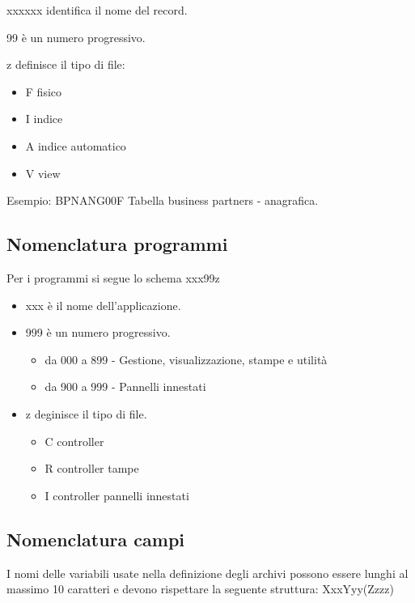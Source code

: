 \documentclass[target=bach,aauheader=,style=]{thud}
\begin{document}
xxxxxx identifica il nome del record.

99 è un numero progressivo.

z definisce il tipo di file:
\begin{itemize}
    \item F fisico
    \item I indice
    \item A indice automatico
    \item V view
\end{itemize}

Esempio: BPNANG00F Tabella business partners - anagrafica.

\subsection{Nomenclatura programmi}
Per i programmi si segue lo schema xxx99z

\begin{itemize}
    \item xxx è il nome dell'applicazione.

    \item 999 è un numero progressivo.
    \begin{itemize}
        \item da 000 a 899 - Gestione, visualizzazione, stampe e utilità
        \item da 900 a 999 - Pannelli innestati
    \end{itemize}

    \item z deginisce il tipo di file.
    \begin{itemize}
        \item C controller
        \item R controller tampe
        \item I controller pannelli innestati
    \end{itemize}
\end{itemize}
\subsection{Nomenclatura campi}

I nomi delle variabili usate nella definizione degli archivi possono essere lunghi al massimo 10 caratteri e
devono rispettare la seguente struttura:
XxxYyy(Zzzz)
\end{document}
